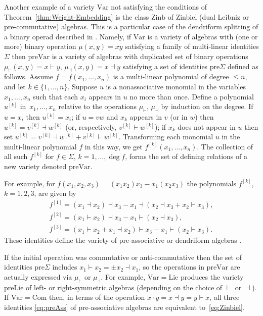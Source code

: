 \documentclass[11pt]{article}
\numberwithin{equation}{section}
\numberwithin{equation}{section}
\def\Var{\mathrm{Var}}
\def\Com{\mathrm{Com}}
\def\Lie{\mathrm{Lie}}
\def\Zinb{\mathrm{Zinb}}
\def\pre{\mathrm{pre}}
\begin{document}
Another example of a variety
$\Var $ not satisfying the conditions
of Theorem~\ref{thm:Weight-Embedding}
is the class $\Zinb$ of Zinbiel (dual Leibniz or pre-commutative) algebras.
This is a particular case of the dendriform
splitting of a binary operad described in
\cite{BBGN, GubKol2014}.
Namely,
if $\Var $ is a variety of algebras with (one or more) binary operation
$\mu (x,y) = xy$ satisfying a family
of multi-linear identities $\Sigma $
then
$\pre\Var $ is a variety of algebras with
duplicated set of binary operations
$\mu_\vdash (x,y)=x\vdash y $,
$\mu_\dashv (x,y) = x\dashv y$
satisfying a set of identities $\pre\Sigma $
defined as follows.
Assume $f = f(x_1,\dots, x_n)$ is a multi-linear polynomial of degree $\le n$, and let $k\in \{1,\dots, n\}$.
Suppose $u$ is a nonassociative monomial in the variables
$x_1,\dots, x_n$ such that each $x_i$ appears in $u$
no more than once.
Define a polynomial~$u^{[k]}$ in~$x_1,\dots, x_n$
relative to the operations $\mu_\vdash $, $\mu _\dashv$
by induction on the degree.
If $u=x_i$ then
$u^{[k]} = x_i$;
if $u = vw$ and $x_k$ appears in $v$ (or in $w$) then
$u^{[k]} = v^{[k]}\dashv w^{[k]}$ (or, respectively,
$v^{[k]}\vdash w^{[k]}$);
if $x_k$ does not appear in $u$ then set
$u^{[k]}=
v^{[k]}\dashv w^{[k]} + v^{[k]}\vdash w^{[k]}$.
Transforming each monomial $u$ in the
multi-linear polynomial $f$
in this way, we get $f^{[k]}(x_1,\dots, x_n)$.
The collection of all such $f^{[k]}$
for $f\in \Sigma $, $k=1,\dots,\deg f$,
forms the set of defining relations of a new variety denoted
$\pre\Var $.

For example, for $f(x_1,x_2,x_3)
= (x_1x_2)x_3 - x_1(x_2x_3)$
the polynomials $f^{[k]}$, $k=1,2,3$, are given by
%
\begin{gather}
f^{[1]} = (x_1\dashv x_2)\dashv x_3 - x_1\dashv (x_2\dashv x_3 + x_2\vdash x_3),\nonumber \\
f^{[2]}
= (x_1\vdash x_2)\dashv x_3 - x_1\vdash (x_2\dashv x_3),\nonumber\\
f^{[3]}
= (x_1\vdash x_2 + x_1\dashv x_2)\vdash x_3 - x_1\vdash (x_2\vdash x_3).\label{eq:preAss}
\end{gather}
These identities define the variety of pre-associative
or dendriform algebras \cite{Loday}.

If the initial operation was commutative or anti-commutative then the set of identities $\pre\Sigma $
includes $x_1\vdash x_2 = \pm x_2\dashv x_1$,
so the operations in $\pre\Var $ are actually
expressed via $\mu_\vdash $ or $\mu_\dashv $.
For example, $\Var=\Lie$ produces the variety
$\pre\Lie$ of left- or right-symmetric algebras
(depending on the choice of $\vdash $ or $\dashv$).
If $\Var = \Com$ then, in terms of the operation
$x\cdot y = x\dashv y = y\vdash x$,
all three identities \eqref{eq:preAss}
of pre-associative algebras are equivalent to~\eqref{eq:Zinbiel}.
\end{document}
